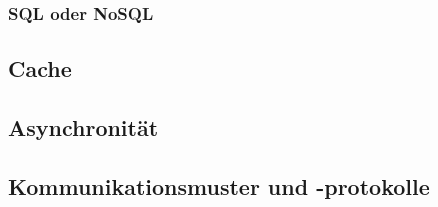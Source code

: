 \documentclass[../main.tex]{subfiles}
\begin{document}
	\subsubsection{SQL oder NoSQL}
	\clearpage

	\subsection{Cache}
	\clearpage
	
	\subsection{Asynchronität}
	\clearpage
	
	\subsection{Kommunikationsmuster und -protokolle}
	\clearpage
	
\end{document}
